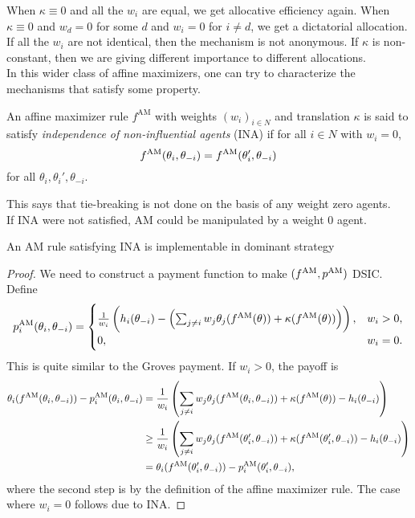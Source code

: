 		When $\kappa \equiv 0$ and all the $w_i$ are equal, we get allocative efficiency again. When $\kappa \equiv 0$ and $w_d = 0$ for some $d$ and $w_i = 0$ for $i \ne d$, we get a dictatorial allocation.\\
		If all the $w_i$ are not identical, then the mechanism is not anonymous. If $\kappa$ is non-constant, then we are giving different importance to different allocations.\\
		In this wider class of affine maximizers, one can try to characterize the mechanisms that satisfy some property.

		\begin{fdef}
			An affine maximizer rule $f^\text{AM}$ with weights $(w_i)_{i \in N}$ and translation $\kappa$ is said to satisfy \emph{independence of non-influential agents} (INA) if for all $i \in N$ with $w_i = 0$,
			\[ f^{\text{AM}}(\theta_i,\theta_{-i}) = f^{\text{AM}}(\theta_i',\theta_{-i}) \]
			for all $\theta_i,\theta_i',\theta_{-i}$. 
		\end{fdef}
		This says that tie-breaking is not done on the basis of any weight zero agents.\\
		If INA were not satisfied, AM could be manipulated by a weight $0$ agent.

		\begin{ftheo}
			An AM rule satisfying INA is implementable in dominant strategy
		\end{ftheo}
		\begin{proof}
			We need to construct a payment function to make $(f^{\text{AM}},p^{\text{AM}})$ DSIC. Define
			\[ p_i^{\text{AM}}(\theta_i,\theta_{-i}) = \begin{cases} \frac{1}{w_i} \left( h_i(\theta_{-i}) - \left( \sum_{j \ne i} w_j \theta_j(f^{\text{AM}}(\theta)) + \kappa(f^{\text{AM}}(\theta)) \right) \right), & w_i > 0, \\ 0, & w_i = 0. \end{cases} \]
			This is quite similar to the Groves payment.
			If $w_i > 0$, the payoff is
			\begin{align*}
				\theta_i(f^{\text{AM}}(\theta_i,\theta_{-i})) - p_i^{\text{AM}}(\theta_i,\theta_{-i}) &= \frac{1}{w_i} \left( \sum_{j \ne i} w_j \theta_j(f^{\text{AM}}(\theta_i,\theta_{-i})) + \kappa(f^{\text{AM}}(\theta)) - h_i(\theta_{-i}) \right) \\
					&\ge \frac{1}{w_i} \left( \sum_{j \ne i} w_j \theta_j(f^{\text{AM}}(\theta_i',\theta_{-i})) + \kappa(f^{\text{AM}}(\theta_i',\theta_{-i})) - h_i(\theta_{-i}) \right) \\
					&= \theta_i(f^{\text{AM}}(\theta_i',\theta_{-i})) - p_i^{\text{AM}}(\theta_i',\theta_{-i}),
			\end{align*}
			where the second step is by the definition of the affine maximizer rule. The case where $w_i = 0$ follows due to INA.
		\end{proof}


